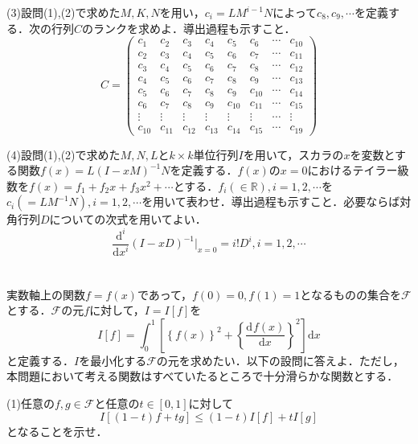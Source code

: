 \documentclass[a4j]{jarticle}
\newcommand{\diff}[3]{
  \frac{\mathrm{d}^{#1} #2}{\mathrm{d} #3^{#1}}
}
\begin{document}
\begin{screen}
 (3)設問(1),(2)で求めた$M,K,N$を用い，$c_i=LM^{i-1}N$によって$c_8,c_9,\cdots$を定義する．次の行列$C$のランクを求めよ．導出過程も示すこと．
 $$C=
 \begin{pmatrix}
  c_1 & c_2 & c_3 & c_4 & c_5 & c_6 & \cdots & c_{10} \\
  c_2 & c_3 & c_4 & c_5 & c_6 & c_7 & \cdots & c_{11} \\
  c_3 & c_4 & c_5 & c_6 & c_7 & c_8 & \cdots & c_{12} \\
  c_4 & c_5 & c_6 & c_7 & c_8 & c_9 & \cdots & c_{13} \\
  c_5 & c_6 & c_7 & c_8 & c_9 & c_{10} & \cdots & c_{14} \\
  c_6 & c_7 & c_8 & c_9 & c_{10} & c_{11} & \cdots & c_{15} \\
  \vdots & \vdots & \vdots & \vdots & \vdots & \vdots & \cdots & \vdots \\
  c_{10} & c_{11} & c_{12} & c_{13} & c_{14} & c_{15} & \cdots & c_{19}
 \end{pmatrix}$$
\end{screen}

\begin{screen}
 (4)設問(1),(2)で求めた$M,N,L$と$k \times k$単位行列$I$を用いて，スカラの$x$を変数とする関数$f(x)=L(I-xM)^{-1}N$を定義する．$f(x)$の$x=0$におけるテイラー級数を$f(x)=f_1+f_2x+f_3x^2+\cdots$とする．$f_i(\in\mathbb{R}),i=1,2,\cdots$を$c_i(=LM^{-1}N),i=1,2,\cdots$を用いて表わせ．導出過程も示すこと．必要ならば対角行列$D$についての次式を用いてよい．
 $$\diff{i}{}{x}(I-xD)^{-1}\Biggr|_{x=0}=i!D^i,i=1,2,\cdots$$
\end{screen}

\section{}

\begin{screen}
 実数軸上の関数$f=f(x)$であって，$f(0)=0,f(1)=1$となるものの集合を$\mathcal{F}$とする．$\mathcal{F}$の元$f$に対して，$I=I[f]$を
 $$I[f]=\int_0^1\left[\left\{f(x)\right\}^2+\left\{\diff{}{f(x)}{x}\right\}^2\right]\mathrm{d}x$$
 と定義する．$I$を最小化する$\mathcal{F}$の元を求めたい．以下の設問に答えよ．ただし，本問題において考える関数はすべていたるところで十分滑らかな関数とする．
\end{screen}

\begin{screen}
 (1)任意の$f,g\in\mathcal{F}$と任意の$t\in[0,1]$に対して
 $$I[(1-t)f+tg]\leq(1-t)I[f]+tI[g]$$
 となることを示せ．
\end{screen}
\end{document}
